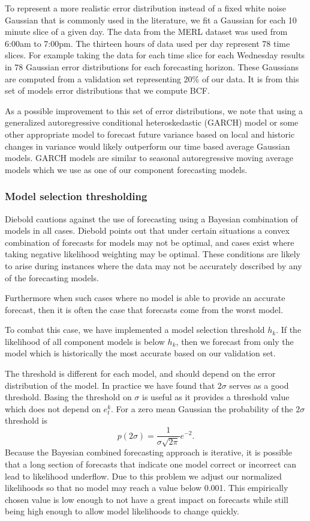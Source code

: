 To represent a more realistic error distribution instead of a fixed white noise Gaussian that is commonly used in the literature, we fit a Gaussian for each 10 minute slice of a given day.  The data from the MERL dataset was used from 6:00am to 7:00pm. The thirteen hours of data used per day represent 78 time slices.  For example taking the data for each time slice for each Wednesday results in 78 Gaussian error distributions for each forecasting horizon.  These Gaussians are computed from a validation set representing 20\% of our data.  It is from this set of models error distributions that we compute BCF.

As a possible improvement to this set of error distributions, we note that using a generalized autoregressive conditional heteroskedastic (GARCH) model \cite{Box2008} or some other appropriate model to forecast future variance based on local and historic changes in variance would likely outperform our time based average Gaussian models.  GARCH models are similar to seasonal autoregressive moving average models which we use as one of our component forecasting models.

\subsubsection{Model selection thresholding}
Diebold \cite{Diebold1991} cautions against the use of forecasting using a Bayesian combination of models in all cases.  Diebold points out that under certain situations a convex combination of forecasts for models may not be optimal, and cases exist where taking negative likelihood weighting may be optimal.  These conditions are likely to arise during instances where the data may not be accurately described by any of the forecasting models.  

Furthermore when such cases where no model is able to provide an accurate forecast, then it is often the case that forecasts come from the worst model.  

To combat this case, we have implemented a model selection threshold $h_{k}$.  If the likelihood of all component models is below $h_{k}$, then we forecast from only the model which is historically the most accurate based on our validation set.  

The threshold is different for each model, and should depend on the error distribution of the model.  In practice we have found that $2\sigma$ serves as a good threshold.  Basing the threshold on $\sigma$ is useful as it provides a threshold value which does not depend on $e^{k}_{t}$.  For a zero mean Gaussian the probability of the $2\sigma$ threshold is
\begin{equation}
p(2\sigma) = \frac{1}{\sigma\sqrt{2\pi}}e^{-2}.
\end{equation}
Because the Bayesian combined forecasting approach is iterative, it is possible that a long section of forecasts that indicate one model correct or incorrect can lead to likelihood underflow.  Due to this problem we adjust our normalized likelihoods so that no model may reach a value below 0.001.  This empirically chosen value is low enough to not have a great impact on forecasts while still being high enough to allow model likelihoods to change quickly.

